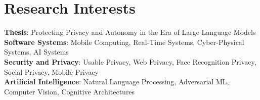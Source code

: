 \section{Research Interests}
 \begin{itemize}[leftmargin=0.5cm, label={}]
    \small{\item{
     \textbf{Thesis}{: Protecting Privacy and Autonomy in the Era of Large Language Models} \\
     \textbf{Software Systems}{: Mobile Computing, Real-Time Systems, Cyber-Physical Systems, AI Systems} \\
     \textbf{Security and Privacy}{: Usable Privacy, Web Privacy, Face Recognition Privacy, Social Privacy, Mobile Privacy} \\
     \textbf{Artificial Intelligence}{: Natural Language Processing, Adversarial ML, Computer Vision, Cognitive Architectures} \\
    }}
 \end{itemize}